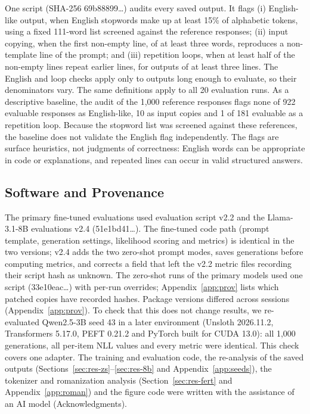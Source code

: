 \documentclass{article}
\begin{document}
One script (SHA-256 69b88899\ldots{}) audits every saved output. It flags (i) English-like output, when English stopwords make up at least 15\% of alphabetic tokens, using a fixed 111-word list screened against the reference responses; (ii) input copying, when the first non-empty line, of at least three words, reproduces a non-template line of the prompt; and (iii) repetition loops, when at least half of the non-empty lines repeat earlier lines, for outputs of at least three lines. The English and loop checks apply only to outputs long enough to evaluate, so their denominators vary. The same definitions apply to all 20 evaluation runs. As a descriptive baseline, the audit of the 1,000 reference responses flags none of 922 evaluable responses as English-like, 10 as input copies and 1 of 181 evaluable as a repetition loop. Because the stopword list was screened against these references, the baseline does not validate the English flag independently. The flags are surface heuristics, not judgments of correctness: English words can be appropriate in code or explanations, and repeated lines can occur in valid structured answers.

\subsection{Software and Provenance}\label{sec:software}

The primary fine-tuned evaluations used evaluation script v2.2 and the Llama-3.1-8B evaluations v2.4 (51e1bd41\ldots{}). The fine-tuned code path (prompt template, generation settings, likelihood scoring and metrics) is identical in the two versions; v2.4 adds the two zero-shot prompt modes, saves generations before computing metrics, and corrects a field that left the v2.2 metric files recording their script hash as unknown. The zero-shot runs of the primary models used one script (33e10eac\ldots{}) with per-run overrides; Appendix~\ref{app:prov} lists which patched copies have recorded hashes. Package versions differed across sessions (Appendix~\ref{app:prov}). To check that this does not change results, we re-evaluated Qwen2.5-3B seed 43 in a later environment (Unsloth 2026.11.2, Transformers 5.17.0, PEFT 0.21.2 and PyTorch built for CUDA 13.0): all 1,000 generations, all per-item NLL values and every metric were identical. This check covers one adapter. The training and evaluation code, the re-analysis of the saved outputs (Sections~\ref{sec:res-zs}–\ref{sec:res-8b} and Appendix~\ref{app:seeds}), the tokenizer and romanization analysis (Section~\ref{sec:res-fert} and Appendix~\ref{app:roman}) and the figure code were written with the assistance of an AI model (Acknowledgments).
\end{document}
